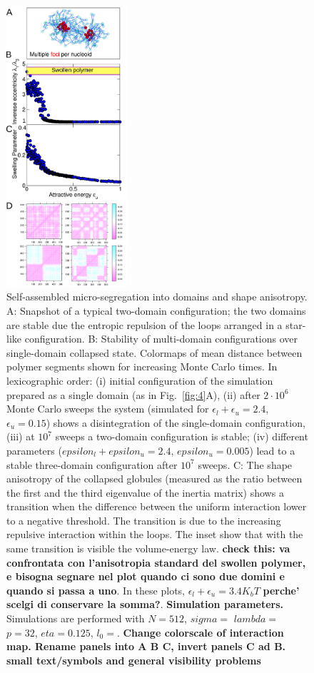 \documentclass[
preprint,
a4paper,
12pt,
superscriptaddress,
pre]{revtex4}
\begin{document}
\begin{figure}
  \centering
  \includegraphics[width=0.4\textwidth]{fig5}
  \caption{Self-assembled micro-segregation into domains and shape
    anisotropy.  A: Snapshot of a typical two-domain configuration;
    the two domains are stable due the entropic repulsion of the
    loops arranged in a star-like configuration.   
%
B: Stability of multi-domain configurations over single-domain
collapsed 
state. Colormaps of mean distance between polymer segments shown for
increasing Monte Carlo times.  
%
In lexicographic order:  (i)  initial configuration of the simulation 
prepared as a single domain (as in Fig.~\ref{fig:4}A), (ii) after
$2\cdot10^6$ 
Monte Carlo sweeps the system (simulated for
$\epsilon_l+\epsilon_u=2.4$, 
$\epsilon_u=0.15$)  shows a disintegration of the single-domain
configuration,  (iii) 
  at $10^7$  sweeps a two-domain configuration is stable;
  (iv)  different parameters    
($epsilon_l+epsilon_u=2.4$, $epsilon_u=0.005$) lead to a stable
three-domain 
configuration after $10^7$ sweeps.
%  
    C: The shape anisotropy of the collapsed globules (measured as the
    ratio between the first and the third eigenvalue of the inertia
    matrix)  shows a transition when the difference between the
    uniform  
    interaction  lower to a negative threshold. The
    transition is due to 
    the increasing repulsive interaction within the loops. The inset
    show that with  the same transition is visible  the volume-energy
    law.  \textbf{check this:  va 
      confrontata con l'anisotropia standard del swollen polymer,
      e bisogna segnare nel plot quando ci sono due domini e quando si
    passa a uno}. In these plots, 
    $\epsilon_l+\epsilon_u=3.4 K_b T$ \textbf{perche' scelgi di
      conservare la somma?}.  
%
\textbf{Simulation parameters. }
Simulations are performed with $N = 512$, $sigma =$ 
 $lambda =$   $p=32$, $eta=0.125$, $l_0= $.  
%
\textbf{Change colorscale of interaction map. Rename panels into A B
  C, invert panels C ad B. small text/symbols and general visibility problems} }
  \label{fig:5}
\end{figure}
\end{document}
